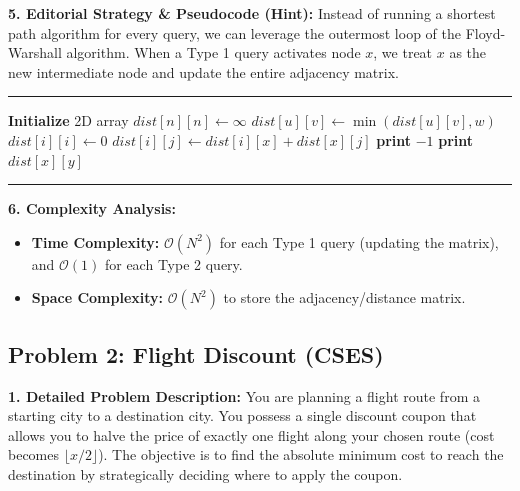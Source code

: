\textbf{5. Editorial Strategy \& Pseudocode (Hint):}
Instead of running a shortest path algorithm for every query, we can leverage the outermost loop of the Floyd-Warshall algorithm. When a Type 1 query activates node $x$, we treat $x$ as the new intermediate node and update the entire adjacency matrix.

\vspace{0.5em}
\noindent\rule{\textwidth}{0.6pt}
\begin{algorithmic}[1]
\State \textbf{Initialize} 2D array $dist[n][n] \gets \infty$
    \State $dist[u][v] \gets \min(dist[u][v], w)$
\EndFor
{}
    \State $dist[i][i] \gets 0$
\EndFor
\Statex
{}
                    \State $dist[i][j] \gets dist[i][x] + dist[x][j]$
                \EndIf
            \EndFor
        \EndFor
            \State \textbf{print} $-1$
        \Else
            \State \textbf{print} $dist[x][y]$
        \EndIf
    \EndIf
\EndFor
\end{algorithmic}
\vspace{-0.5em}
\noindent\rule{\textwidth}{0.6pt}
\vspace{0.5em}

\textbf{6. Complexity Analysis:}
\begin{itemize}
    \item \textbf{Time Complexity:} $\mathcal{O}(N^2)$ for each Type 1 query (updating the matrix), and $\mathcal{O}(1)$ for each Type 2 query.
    \item \textbf{Space Complexity:} $\mathcal{O}(N^2)$ to store the adjacency/distance matrix.
\end{itemize}

\subsection{Problem 2: Flight Discount (CSES)}

\textbf{1. Detailed Problem Description:}
You are planning a flight route from a starting city to a destination city. You possess a single discount coupon that allows you to halve the price of exactly one flight along your chosen route (cost becomes $\lfloor x/2 \rfloor$). The objective is to find the absolute minimum cost to reach the destination by strategically deciding where to apply the coupon.

